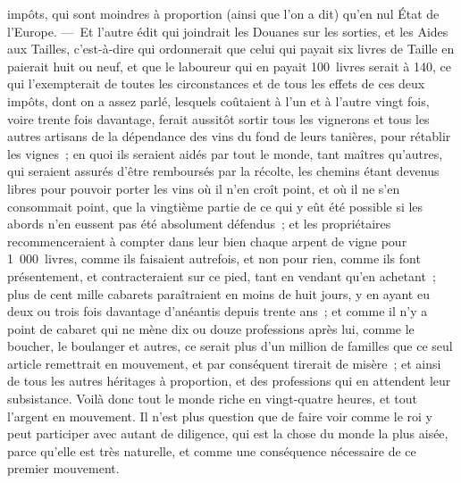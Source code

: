 \documentclass[french,twoside]{book} %
\begin{document}
impôts, qui sont moindres à proportion (ainsi que l’on a dit) qu’en nul État de l’Europe. — Et l’autre édit qui joindrait les Douanes sur les sorties, et les Aides aux Tailles, c’est-à-dire qui ordonnerait que celui qui payait six livres de Taille en paierait huit ou neuf, et que le laboureur qui en payait 100 livres serait à 140, ce qui l’exempterait de toutes les circonstances et de tous les effets de ces deux impôts, dont on a assez parlé, lesquels coûtaient à l’un et à l’autre vingt fois, voire trente fois davantage, ferait aussitôt sortir tous les vignerons et tous les autres artisans de la dépendance des vins du fond de leurs tanières, pour rétablir les vignes ; en quoi ils seraient aidés par tout le monde, tant maîtres qu’autres, qui seraient assurés d’être remboursés par la récolte, les chemins étant devenus libres pour pouvoir porter les vins où il n’en croît point, et où il ne s’en consommait point, que la vingtième partie de ce qui y eût été possible si les abords n’en eussent pas été absolument défendus ; et les propriétaires recommenceraient à compter dans leur bien chaque arpent de vigne pour 1 000 livres, comme ils faisaient autrefois, et non pour rien, comme ils font présentement, et contracteraient sur ce pied, tant en vendant qu’en achetant ; plus de cent mille cabarets paraîtraient en moins de huit jours, y en ayant eu deux ou trois fois davantage d’anéantis depuis trente ans ; et comme il n’y a point de cabaret qui ne mène dix ou douze professions après lui, comme le boucher, le boulanger et autres, ce serait plus d’un million de familles que ce seul article remettrait en mouvement, et par conséquent tirerait de misère ; et ainsi de tous les autres héritages à proportion, et des professions qui en attendent leur subsistance. Voilà donc tout le monde riche en vingt-quatre heures, et tout l’argent en mouvement. Il n’est plus question que de faire voir comme le roi y peut participer avec autant de diligence, qui est la chose du monde la plus aisée, parce qu’elle est très naturelle, et comme une conséquence nécessaire de ce premier mouvement.\par
\end{document}
